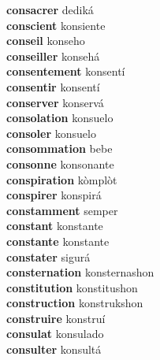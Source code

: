 \textbf{consacrer } dediká \\
\textbf{conscient } konsiente \\
\textbf{conseil } konseho \\
\textbf{conseiller } konsehá \\
\textbf{consentement } konsentí \\
\textbf{consentir } konsentí \\
\textbf{conserver } konservá \\
\textbf{consolation } konsuelo \\
\textbf{consoler } konsuelo \\
\textbf{consommation } bebe \\
\textbf{consonne } konsonante \\
\textbf{conspiration } kòmplòt \\
\textbf{conspirer } konspirá \\
\textbf{constamment } semper \\
\textbf{constant } konstante \\
\textbf{constante } konstante \\
\textbf{constater } sigurá \\
\textbf{consternation } konsternashon \\
\textbf{constitution } konstitushon \\
\textbf{construction } konstrukshon \\
\textbf{construire } konstruí \\
\textbf{consulat } konsulado \\
\textbf{consulter } konsultá \\
